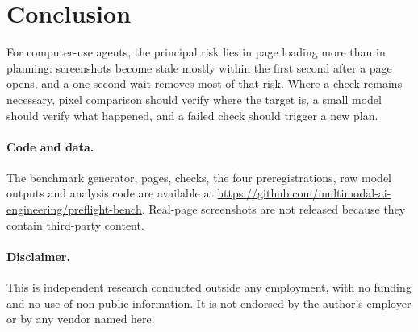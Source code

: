 \documentclass[10pt]{article}
\newcommand{\repo}{\url{https://github.com/multimodal-ai-engineering/preflight-bench}}
\begin{document}
\section{Conclusion}

For computer-use agents, the principal risk lies in page loading more than in planning: screenshots become stale mostly within the first second after a page opens, and a one-second wait removes most of that risk. Where a check remains necessary, pixel comparison should verify where the target is, a small model should verify what happened, and a failed check should trigger a new plan.

\paragraph{Code and data.} The benchmark generator, pages, checks, the four preregistrations, raw model outputs and analysis code are available at \repo. Real-page screenshots are not released because they contain third-party content.

\paragraph{Disclaimer.} This is independent research conducted outside any employment, with no funding and no use of non-public information. It is not endorsed by the author's employer or by any vendor named here.



\end{document}

